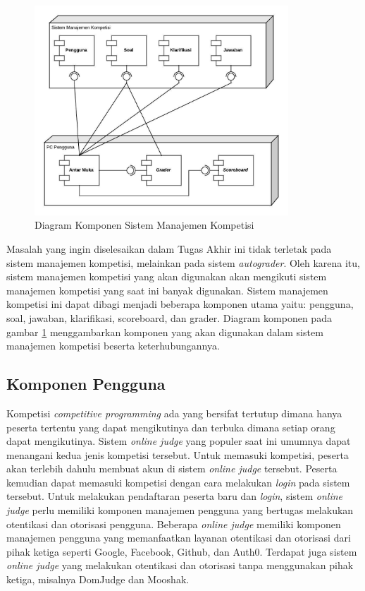 \begin{figure}[ht!]
    \centering
    \includegraphics[width=0.85\textwidth]{images/oj-components}
    \caption{Diagram Komponen Sistem Manajemen Kompetisi}
    \label{fig:oj-components}
\end{figure}

\par Masalah yang ingin diselesaikan dalam Tugas Akhir ini tidak terletak pada sistem manajemen kompetisi, melainkan pada sistem \textit{autograder}. Oleh karena itu, sistem manajemen kompetisi yang akan digunakan akan mengikuti sistem manajemen kompetisi yang saat ini banyak digunakan. Sistem manajemen kompetisi ini dapat dibagi menjadi beberapa komponen utama yaitu: pengguna, soal, jawaban, klarifikasi, scoreboard, dan grader. Diagram komponen pada gambar \ref{fig:oj-components} menggambarkan komponen yang akan digunakan dalam sistem manajemen kompetisi beserta keterhubungannya.

\subsection{Komponen Pengguna}

\par Kompetisi \textit{competitive programming} ada yang bersifat tertutup dimana hanya peserta tertentu yang dapat mengikutinya dan terbuka dimana setiap orang dapat mengikutinya. Sistem \textit{online judge} yang populer saat ini umumnya dapat menangani kedua jenis kompetisi tersebut. Untuk memasuki kompetisi, peserta akan terlebih dahulu membuat akun di sistem \textit{online judge} tersebut. Peserta kemudian dapat memasuki kompetisi dengan cara melakukan \textit{login} pada sistem tersebut. Untuk melakukan pendaftaran peserta baru dan \textit{login}, sistem \textit{online judge} perlu memiliki komponen manajemen pengguna yang bertugas melakukan otentikasi dan otorisasi pengguna. Beberapa \textit{online judge} memiliki komponen manajemen pengguna yang memanfaatkan layanan otentikasi dan otorisasi dari pihak ketiga seperti Google, Facebook, Github, dan Auth0. Terdapat juga sistem \textit{online judge} yang melakukan otentikasi dan otorisasi tanpa menggunakan pihak ketiga, misalnya DomJudge dan Mooshak.

